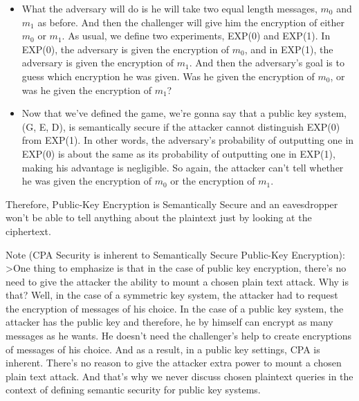\documentclass[11pt]{article}
\begin{document}
\begin{itemize}
\item
  What the adversary will do is he will take two equal length messages,
  \(m_{0}\) and \(m_{1}\) as before. And then the challenger will give
  him the encryption of either \(m_{0}\) or \(m_{1}\). As usual, we
  define two experiments, EXP(0) and EXP(1). In EXP(0), the adversary is
  given the encryption of \(m_{0}\), and in EXP(1), the adversary is
  given the encryption of \(m_{1}\). And then the adversary's goal is to
  guess which encryption he was given. Was he given the encryption of
  \(m_{0}\), or was he given the encryption of \(m_{1}\)? 
\item
  Now that we've defined the game, we're gonna say that a public key
  system, (G, E, D), is semantically secure if the attacker cannot
  distinguish EXP(0) from EXP(1). In other words, the adversary's
  probability of outputting one in EXP(0) is about the same as its
  probability of outputting one in EXP(1), making his advantage is
  negligible. So again, the attacker can't tell whether he was given the
  encryption of \(m_{0}\) or the encryption of \(m_{1}\). 
\end{itemize}

Therefore, Public-Key Encryption is Semantically Secure and an
eavesdropper won't be able to tell anything about the plaintext just by
looking at the ciphertext.

Note (CPA Security is inherent to Semantically Secure Public-Key
Encryption): \textgreater{}One thing to emphasize is that in the case of
public key encryption, there's no need to give the attacker the ability
to mount a chosen plain text attack. Why is that? Well, in the case of a
symmetric key system, the attacker had to request the encryption of
messages of his choice. In the case of a public key system, the attacker
has the public key and therefore, he by himself can encrypt as many
messages as he wants. He doesn't need the challenger's help to create
encryptions of messages of his choice. And as a result, in a public key
settings, CPA is inherent. There's no reason to give the attacker extra
power to mount a chosen plain text attack. And that's why we never
discuss chosen plaintext queries in the context of defining semantic
security for public key systems.
\end{document}

